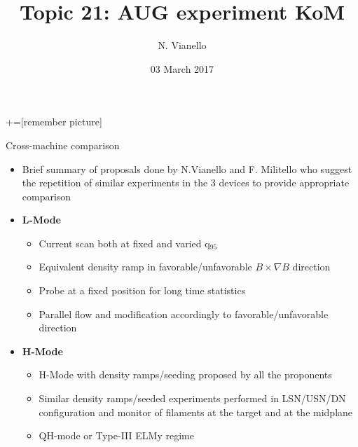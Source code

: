 \documentclass[10pt, compress]{beamer}
\title{Topic 21: AUG experiment KoM}
\date{03 March 2017}
\author[N.Vianello]{N. Vianello}
\begin{document}
+=[remember picture]
\maketitle

\begin{frame}{Cross-machine comparison}
\vspace{-1cm}
  \begin{itemize}
    \item Brief summary of proposals done by N.Vianello and
      F. Militello who suggest the repetition of similar experiments
      in the 3 devices to provide appropriate comparison
    \item<2|only@2> \textbf{L-Mode}
      \begin{itemize}
        \item Current scan both at fixed and varied q$_{95}$
        \item Equivalent density ramp in favorable/unfavorable
          $B\times \nabla B$ direction
        \item Probe at a fixed position for long time statistics
        \item Parallel flow and modification accordingly to
          favorable/unfavorable direction
        \end{itemize}
      \item<3|only@3> \textbf{H-Mode}
      \begin{itemize}
        \item H-Mode with density ramps/seeding proposed by all the proponents
        \item Similar density ramps/seeded experiments performed in
          LSN/USN/DN configuration and monitor of filaments at the
          target and at the midplane
        \item QH-mode or Type-III ELMy regime
        \end{itemize}
\end{itemize}
\end{frame}
\end{document}
